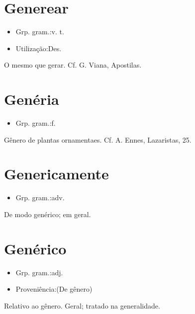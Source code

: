 \section{Generear}
\begin{itemize}
\item {Grp. gram.:v. t.}
\end{itemize}
\begin{itemize}
\item {Utilização:Des.}
\end{itemize}
O mesmo que \textunderscore gerar\textunderscore . Cf. G. Viana, \textunderscore Apostilas\textunderscore .
\section{Genéria}
\begin{itemize}
\item {Grp. gram.:f.}
\end{itemize}
Gênero de plantas ornamentaes. Cf. A. Ennes, \textunderscore Lazaristas\textunderscore , 25.
\section{Genericamente}
\begin{itemize}
\item {Grp. gram.:adv.}
\end{itemize}
De modo genérico; em geral.
\section{Genérico}
\begin{itemize}
\item {Grp. gram.:adj.}
\end{itemize}
\begin{itemize}
\item {Proveniência:(De \textunderscore gênero\textunderscore )}
\end{itemize}
Relativo ao gênero.
Geral; tratado na generalidade.
